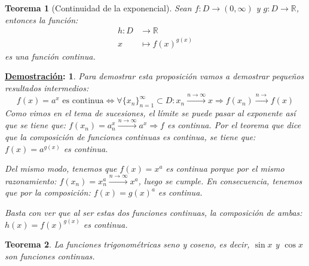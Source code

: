 \documentclass[10pt,a4paper,openright]{book}
\theoremstyle{break}
\newtheorem*{theo}{Teorema}
\newtheorem*{demo}{\underline{Demostración}:}
\begin{document}
\begin{theo}[Continuidad de la exponencial]
Sean $f: D\rightarrow (0,\infty)$ y $g: D\rightarrow \mathbb R$, entonces la función:
\begin{eqnarray*}
h: D &\longrightarrow \mathbb R \\
x &\longmapsto f(x)^{g(x)}
\end{eqnarray*}
es una función continua. 
\end{theo}
\begin{demo}
Para demostrar esta proposición vamos a demostrar pequeños resultados intermedios:
$$f(x)=a^x \mbox{ es continua} \Leftrightarrow \forall\{x_n\}_{n=1}^\infty\subset D: x_n\xrightarrow{n\rightarrow\infty} x\Rightarrow f(x_n)\xrightarrow{n\rightarrow} f(x)$$
Como vimos en el tema de sucesiones, el límite se puede pasar al exponente así que se tiene que: $f(x_n)=a^x_n\xrightarrow{n\rightarrow\infty} a^x\Rightarrow f$ es continua. Por el teorema que dice que la composición de funciones continuas es continua, se tiene que: $f(x)=a^{g(x)}$ es continua.

Del mismo modo, tenemos que $f(x)=x^a$ es continua porque por el mismo razonamiento: $f(x_n)=x_n^a\xrightarrow{n\rightarrow\infty} x^a$, luego se cumple. En consecuencia, tenemos que por la composición: $f(x)=g(x)^a$ es continua.

Basta con ver que al ser estas dos funciones continuas, la composición de ambas: $h(x)=f(x)^{g(x)}$ es continua.
\end{demo}

\begin{theo}
La funciones trigonométricas seno y coseno, es decir, $\sin x$ y $\cos x$ son funciones continuas.
\end{theo}
\end{document}
